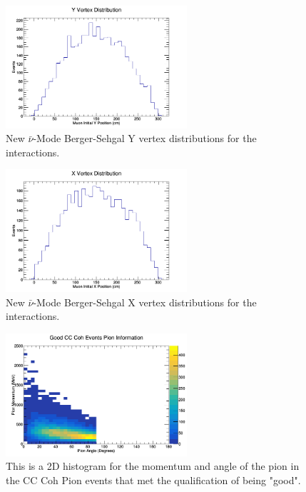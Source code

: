 \documentclass[11pt]{article}
\begin{document}
\begin{figure}[H]
\centering
\includegraphics[width=0.6\textwidth]{NewANMBergerSehgalImages/3-YVertexDistributionANMBS.png}
\caption{New $\bar{\nu}$-Mode Berger-Sehgal Y vertex distributions for the interactions.}
\end{figure}

\begin{figure}[H]
\centering
\includegraphics[width=0.6\textwidth]{NewANMBergerSehgalImages/4-XVertexDistributionANMBS.png}
\caption{New $\bar{\nu}$-Mode Berger-Sehgal X vertex distributions for the interactions.}
\end{figure}

\begin{figure}[H]
\centering
\includegraphics[width=0.6\textwidth]{NewANMBergerSehgalImages/5-GoodCCCohPionInfoANMBS.png}
\caption{This is a 2D histogram for the momentum and angle of the pion in the CC Coh Pion events that met the qualification of being "good".}
\end{figure}
\end{document}
